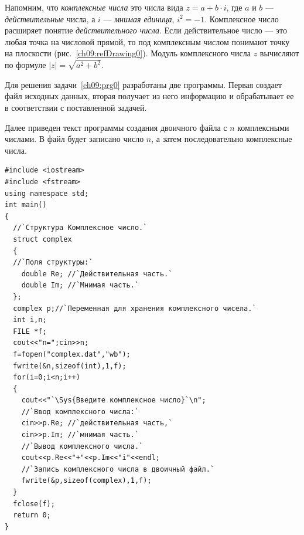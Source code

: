 
Напомним, что \emph{комплексные числа} это числа вида  $z=a+b\cdot i$, где  $a$  и $b$  ---
\emph{действительные} числа, а  $i$  --- \emph{мнимая единица},  $i^2=-1$. Комплексное число
расширяет понятие \emph{действительного числа}. Если действительное число --- это любая точка на числовой
прямой, то под комплексным числом понимают точку на плоскости (рис.~\ref{ch09:refDrawing0}). Модуль комплексного числа  $z$ 
вычисляют по формуле  $|z|=\sqrt{a^2+b^2}$.

Для решения задачи~\ref{ch09:prg0} разработаны две программы. Первая создает файл исходных данных, вторая получает из
него информацию и обрабатывает ее в соответствии с поставленной задачей.

Далее приведен текст программы создания двоичного файла с $n$ комплексными числами. В файл
 будет записано число $n$, а затем последовательно комплексные
числа.
\begin{lstlisting}
#include <iostream>
#include <fstream>
using namespace std;
int main()
{
  //`Структура Комплексное число.`
  struct complex
  {
  //`Поля структуры:` 
    double Re; //`Действительная часть.`
    double Im; //`Мнимая часть.`
  };
  complex p;//`Переменная для хранения комплексного чисела.`
  int i,n;
  FILE *f;
  cout<<"n=";cin>>n;
  f=fopen("complex.dat","wb");
  fwrite(&n,sizeof(int),1,f);
  for(i=0;i<n;i++)
  {
    cout<<"`\Sys{Введите комплексное число}`\n";
    //`Ввод комплексного числа:`
    cin>>p.Re; //`действительная часть,`
    cin>>p.Im; //`мнимая часть.`
    //`Вывод комплексного числа.`
    cout<<p.Re<<"+"<<p.Im<<"i"<<endl;
    //`Запись комплексного числа в двоичный файл.`
    fwrite(&p,sizeof(complex),1,f);
  }
  fclose(f);
  return 0;
}
\end{lstlisting}


